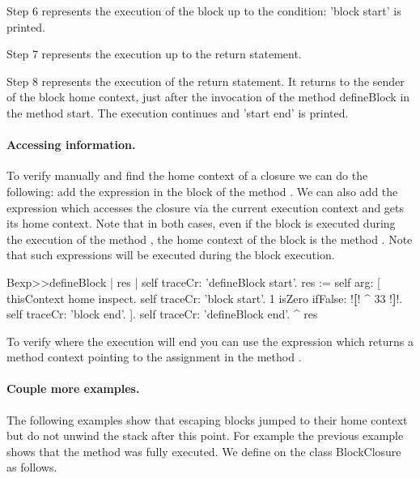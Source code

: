 \documentclass[a4paper,10pt,twoside]{book}
\begin{document}
Step 6 represents the execution of the block up to the condition: 'block start' is printed.

Step 7 represents the execution up to the return statement.

Step 8 represents the execution of the return statement. It returns to the sender of the block home context, \ie just after the invocation of the method defineBlock in the method start. The execution continues and 'start end' is printed.




\paragraph{Accessing information.} 
To verify manually and find the home context of a closure we can do the following: add the expression  in the block of the  method . We can also add the expression  which accesses the closure via the current execution context and gets its home context. Note that in both cases, even if the block is executed during the execution of the method , the home context of the block is the method .
Note that such expressions will be executed during the block execution.

\begin{code}{}
Bexp>>defineBlock
	| res |
	self traceCr: 'defineBlock start'.
	res := self arg: [ thisContext home inspect. self traceCr: 'block start'.
                            1 isZero ifFalse: !\textbf{[}! ^ 33 !\textbf{]}!.
                            self traceCr: 'block end'. ].
	self traceCr: 'defineBlock end'.
	^ res
\end{code}

To verify where the execution will end you can use the expression   which returns a method context pointing to the assignment in the method .

\paragraph{Couple more examples.}
The following examples show that escaping blocks jumped to their home context but do not unwind the stack after this point. For example the previous example shows that the method  was fully executed.
We define  on the class BlockClosure as follows.
\end{document}
